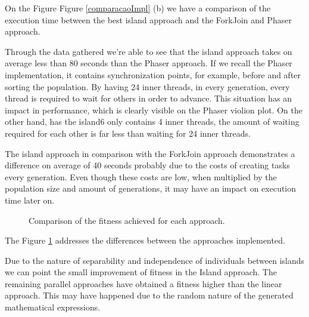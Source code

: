 \documentclass[runningheads]{llncs}
\begin{document}
On the Figure Figure \ref{comparacaoImpl} (b) we have a comparison of the execution time between the best island approach and the ForkJoin and Phaser approach.

Through the data gathered we're able to see that the island approach takes on average less than 80 seconds than the Phaser approach. If we recall the Phaser implementation, it contains synchronization points, for example, before and after sorting the population. By having 24 inner threads, in every generation, every thread is required to wait for others in order to advance. This situation has an impact in performance, which is clearly visible on the Phaser violion plot. On the other hand, has the island6 only contains 4 inner threads, the amount of waiting required for each other is far less than waiting for 24 inner threads.

The island approach in comparison with the ForkJoin approach demonstrates a difference on average of 40 seconds probably due to the costs of creating tasks every generation. Even though these costs are low, when multiplied by the population size and amount of generations, it may have an impact on execution time later on.



\begin{figure}[H]
\centering
{}
\caption{Comparison of the fitness achieved for each approach.} \label{comparacaofitness}
\end{figure}

The Figure \ref{comparacaofitness} addresses the differences between the approaches implemented.

Due to the nature of separability and independence of individuals between islands \cite{islandModelGA} we can point the small improvement of fitness in the Island approach.
The remaining parallel approaches have obtained a fitness higher than the linear approach. This may have happened due to the random nature of the generated mathematical expressions.

\end{document}
